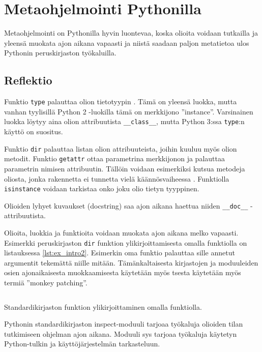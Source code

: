 \documentclass[finnish]{tktltiki2}
\theoremstyle{definition}
\theoremstyle{remark}
\begin{document}
\section{Metaohjelmointi Pythonilla}

Metaohjelmointi on Pythonilla hyvin luontevaa, koska olioita voidaan tutkailla ja yleensä muokata ajon aikana vapaasti ja niistä saadaan paljon metatietoa ulos Pythonin peruskirjaston työkaluilla.


\subsection{Reflektio}

Funktio \verb|type| palauttaa olion tietotyypin \cite{dive-into-python}. Tämä on yleensä luokka, mutta vanhan tyylisillä Python 2 -luokilla tämä on merkkijono ''instance''. Varsinainen luokka löytyy aina olion attribuutista \verb|__class__|, mutta Python 3:ssa \verb|type|:n käyttö on suositus.

Funktio \verb|dir| palauttaa listan olion attribuuteista, joihin kuuluu myös olion metodit. Funktio \verb|getattr| ottaa parametrina merkkijonon ja palauttaa parametrin nimisen attribuutin. Tällöin voidaan esimerkiksi kutsua metodeja oliosta, jonka rakennetta ei tunnetta vielä käännösvaiheessa \cite{dive-into-python}. Funktiolla \verb|isinstance| voidaan tarkistaa onko joku olio tietyn tyyppinen. 

Olioiden lyhyet kuvaukset (docstring) saa ajon aikana haettua niiden \verb|__doc__| -attribuutista.

Olioita, luokkia ja funktioita voidaan muokata ajon aikana melko vapaasti. Esimerkki peruskirjaston \verb|dir| funktion ylikirjoittamisesta omalla funktiolla on listauksessa \ref{lst:ex_intro2}. Esimerkin oma funktio palauttaa sille annetut argumentit tekemättä niille mitään. Tämänkaltaisesta kirjastojen ja moduuleiden osien ajonaikaisesta muokkaamisesta käytetään myös tsesta käytetään myös termiä ''monkey patching''.

\begin{listing}
    \inputminted[linenos]{python}{code/introspektio2.py}
    \caption{Standardikirjaston funktion ylikirjoittaminen omalla funktiolla.}
    \label{lst:ex_intro2}
\end{listing}

Pythonin standardikirjaston inspect-moduuli tarjoaa työkaluja olioiden tilan tutkimiseen ohjelman ajon aikana. Moduuli sys tarjoaa työkaluja käytetyn Python-tulkin ja käyttöjärjestelmän tarkasteluun.
\end{document}
